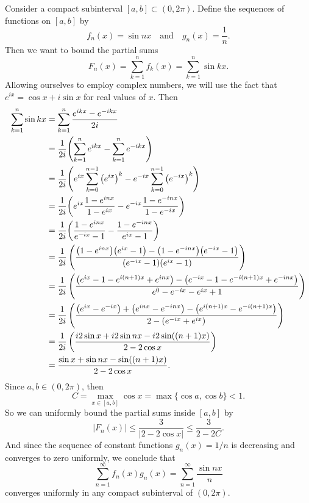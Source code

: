 \documentclass[12pt]{article}
\theoremstyle{definition}
\newcommand{\isp}[1]{\quad\text{#1}\quad}
\newcommand{\pfrac}[2]{\left(\frac{#1}{#2}\right)}
\begin{document}
Consider a compact subinterval $[a, b] \subset (0, 2\pi)$. Define the sequences of functions on $[a, b]$ by
\[
    f_n(x) = \sin nx \isp{and} g_n(x) = \frac{1}{n}.
\]
Then we want to bound the partial sums
\[
    F_n(x)
        = \sum_{k=1}^{n} f_k(x)
        = \sum_{k=1}^{n} \sin kx.
\]
Allowing ourselves to employ complex numbers, we will use the fact that $e^{ix} = \cos x + i\sin x$ for real values of $x$. Then
\begin{align*}
    \sum_{k=1}^{n} \sin kx
        &= \sum_{k=1}^{n} \frac{e^{ikx} - e^{-ikx}}{2i} \\
        &= \frac{1}{2i}\qty(\sum_{k=1}^{n} e^{ikx} - \sum_{k=1}^{n} e^{-ikx}) \\
        &= \frac{1}{2i}\qty(e^{ix}\sum_{k=0}^{n-1} \qty(e^{ix})^k - e^{-ix}\sum_{k=0}^{n-1} \qty(e^{-ix})^k) \\
        &= \frac{1}{2i}\qty(e^{ix}\frac{1 - e^{inx}}{1 - e^{ix}} - e^{-ix}\frac{1 - e^{-inx}}{1 - e^{-ix}}) \\
        &= \frac{1}{2i}\qty(\frac{1 - e^{inx}}{e^{-ix} - 1} - \frac{1 - e^{-inx}}{e^{ix} - 1}) \\
        &= \frac{1}{2i} \pfrac{
            \qty(1 - e^{inx})\qty(e^{ix} - 1) 
            - \qty(1 - e^{-inx})\qty(e^{-ix} - 1)}
            {\qty(e^{-ix} - 1)\qty(e^{ix} - 1)} \\
        &= \frac{1}{2i} \pfrac{
            \qty(e^{ix} - 1 - e^{i(n+1)x} + e^{inx}) 
            - \qty(e^{-ix} - 1 - e^{-i(n+1)x} + e^{-inx})}
            {e^0 - e^{-ix} - e^{ix} + 1} \\
        &= \frac{1}{2i} \pfrac{\qty(e^{ix} - e^{-ix}) + \qty(e^{inx} - e^{-inx}) - \qty(e^{i(n+1)x} - e^{-i(n+1)x})}
            {2 - \qty(e^{-ix} + e^{ix})} \\
        &= \frac{1}{2i} \pfrac{i2\sin x + i2\sin nx - i2\sin((n+1)x)}{2 - 2\cos x} \\
        &= \frac{\sin x + \sin nx - \sin((n+1)x)}{2 - 2\cos x}.
\end{align*}
Since $a, b \in (0, 2\pi)$, then
\[
    C = \max_{x \in [a, b]} \cos x = \max\{\cos a, \cos b\} < 1.
\]
So we can uniformly bound the partial sums inside $[a, b]$ by
\[
    |F_n(x)|
        \leq \frac{3}{|2 - 2\cos x|}
        \leq \frac{3}{2 - 2C}.
\]
And since the sequence of constant functions $g_n(x) = 1/n$ is decreasing and converges to zero uniformly, we conclude that
\[
    \sum_{n=1}^{\infty} f_n(x) g_n(x)
        = \sum_{n=1}^{\infty} \frac{\sin nx}{n}
\]
converges uniformly in any compact subinterval of $(0, 2\pi)$.
\end{document}
